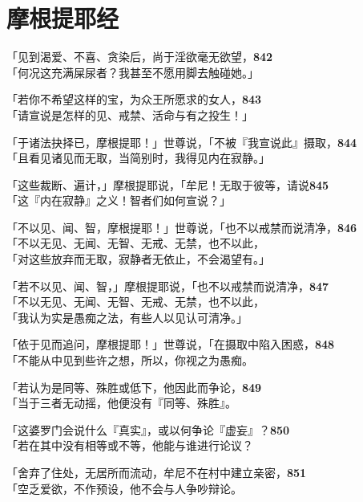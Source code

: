 \section{摩根提耶经}


「见到渴爱、不喜、贪染后，尚于淫欲毫无欲望，\hfill{\grayfootnotesize \textbf{842}} \\
「何况这充满屎尿者？我甚至不愿用脚去触碰她。」


「若你不希望这样的宝，为众王所愿求的女人，\hfill{\grayfootnotesize \textbf{843}} \\
「请宣说是怎样的见、戒禁、活命与有之投生！」


「于诸法抉择已，摩根提耶！」世尊说，「不被『我宣说此』摄取，\hfill{\grayfootnotesize \textbf{844}} \\
「且看见诸见而无取，当简别时，我得见内在寂静。」


「这些裁断、遍计，」摩根提耶说，「牟尼！无取于彼等，请说\hfill{\grayfootnotesize \textbf{845}} \\
「这『内在寂静』之义！智者们如何宣说？」


「不以见、闻、智，摩根提耶！」世尊说，「也不以戒禁而说清净，\hfill{\grayfootnotesize \textbf{846}} \\
「不以无见、无闻、无智、无戒、无禁，也不以此，\\
「对这些放弃而无取，寂静者无依止，不会渴望有。」


「若不以见、闻、智，」摩根提耶说，「也不以戒禁而说清净，\hfill{\grayfootnotesize \textbf{847}} \\
「不以无见、无闻、无智、无戒、无禁，也不以此，\\
「我认为实是愚痴之法，有些人以见认可清净。」


「依于见而追问，摩根提耶！」世尊说，「在摄取中陷入困惑，\hfill{\grayfootnotesize \textbf{848}} \\
「不能从中见到些许之想，所以，你视之为愚痴。


「若认为是同等、殊胜或低下，他因此而争论，\hfill{\grayfootnotesize \textbf{849}} \\
「当于三者无动摇，他便没有『同等、殊胜』。


「这婆罗门会说什么『真实』，或以何争论『虚妄』？\hfill{\grayfootnotesize \textbf{850}} \\
「若在其中没有相等或不等，他能与谁进行论议？


「舍弃了住处，无居所而流动，牟尼不在村中建立亲密，\hfill{\grayfootnotesize \textbf{851}} \\
「空乏爱欲，不作预设，他不会与人争吵辩论。


